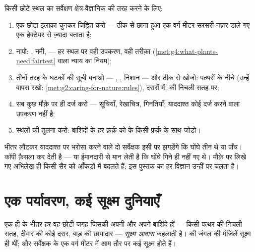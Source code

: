 \begin{method}[किसी स्थल का सर्वेक्षण]\label{met:g6:exploring-our-environment:survey}
किसी छोटे स्थल का सर्वेक्षण क्षेत्र-वैज्ञानिक की तरह करने के लिए:
\begin{enumerate}
  \item एक छोटा इलाक़ा चुनकर चिह्नित करो --- ठीक से छाना हुआ एक वर्ग
        मीटर सरसरी नज़र डाले गए एक हेक्टेयर से ज़्यादा बताता है;
  \item {} नापो: , नमी,  --- हर स्थल पर वही उपकरण,
        वही तरीक़ा
        (\cref{met:g4:what-plants-need:fairtest} वाला न्याय का
        नियम);
  \item तीनों तरह के घटकों की सूची बनाओ --- , , निशान
        --- और ठीक से खोजो: पत्थरों के नीचे (उन्हें वापस रखो:
        \cref{met:g2:caring-for-nature:rules}), दरारों में, 
        की निचली सतह पर;
  \item सब कुछ मौक़े पर ही दर्ज करो --- सूचियाँ, रेखाचित्र, गिनतियाँ;
        याददाश्त कोई दर्ज करने वाला उपकरण नहीं है;
  \item स्थलों की तुलना करो: बाशिंदों के हर फ़र्क़ को  के
        किसी फ़र्क़ के साथ जोड़ो।
\end{enumerate}
\end{method}

\begin{remark}[अभिलेख याददाश्त से बेहतर क्यों हैं]\label{rem:g6:exploring-our-environment:records}
भीतर लौटकर याददाश्त पर भरोसा करने वाले दो सर्वेक्षक इसी पर झगड़ेंगे कि
घोंघे तीन थे या पाँच। कॉपी फ़ैसला कर देती है --- या ईमानदारी से मान लेती
है कि घोंघे गिने ही नहीं गए थे। मौक़े पर लिखे गए अभिलेख ही किसी सैर को
आँकड़ों में बदलते हैं; इस पुस्तक का हर विज्ञान उन्हीं पर चलता है।
\end{remark}

\section{एक पर्यावरण, कई सूक्ष्म दुनियाएँ}

\begin{definition}[सूक्ष्म आवास]\label{def:g6:exploring-our-environment:microhabitat}
एक ही  के भीतर हर वह छोटी जगह जिसकी अपनी  और अपने
बाशिंदे हों --- किसी पत्थर की निचली सतह, दीवार की कोई दरार, बाड़ की
छायादार  --- \emph{सूक्ष्म आवास} कहलाती है।
 की जंगल की मंज़िलें सूक्ष्म 
ही थीं; और सर्वेक्षक के एक वर्ग मीटर में आम तौर पर कई सूक्ष्म 
होते हैं।
\end{definition}

